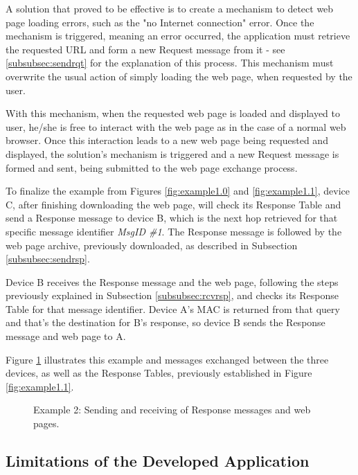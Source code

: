 A solution that proved to be effective is to create a mechanism to detect web page loading errors, such as the "no Internet connection" error. Once the mechanism is triggered, meaning an error occurred, the application must retrieve the requested \gls{URL} and form a new Request message from it - see \ref{subsubsec:sendrqt} for the explanation of this process. This mechanism must overwrite the usual action of simply loading the web page, when requested by the user.

With this mechanism, when the requested web page is loaded and displayed to user, he/she is free to interact with the web page as in the case of a normal web browser. Once this interaction leads to a new web page being requested and displayed, the solution's mechanism is triggered and a new Request message is formed and sent, being submitted to the web page exchange process.

To finalize the example from Figures \ref{fig:example1.0} and \ref{fig:example1.1}, device C, after finishing downloading the web page, will check its Response Table and send a Response message to device B, which is the next hop retrieved for that specific message identifier \textit{MsgID \#1}. The Response message is followed by the web page archive, previously downloaded, as described in Subsection \ref{subsubsec:sendrsp}.

Device B receives the Response message and the web page, following the steps previously explained in Subsection \ref{subsubsec:rcvrsp}, and checks its Response Table for that message identifier. Device A's \gls{MAC} is returned from that query and that's the destination for B's response, so device B sends the Response message and web page to A.

Figure \ref{fig:example1.2} illustrates this example and messages exchanged between the three devices, as well as the Response Tables, previously established in Figure \ref{fig:example1.1}.

\begin{figure}[ht]
   \noindent{}
	\caption{\label{fig:example1.2} Example 2: Sending and receiving of Response messages and web pages.}
\end{figure}

\subsection{Limitations of the Developed Application}











